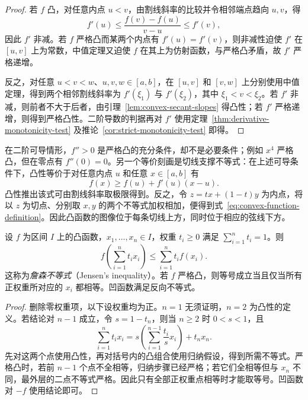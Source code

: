 \documentclass[UTF8,12pt,a4paper,fontset=fandol]{ctexbook}
\begin{document}
\begin{proof}
若 $f$ 凸，对任意内点 $u<v$，由割线斜率的比较并令相邻端点趋向 $u,v$，得
\begin{equation}
    f'(u)\leq\frac{f(v)-f(u)}{v-u}\leq f'(v),
    \label{eq:convex-derivative-secant-bounds}
\end{equation}
因此 $f'$ 非减。若 $f$ 严格凸而某两个内点有 $f'(u)=f'(v)$，则非减性迫使 $f'$ 在 $[u,v]$ 上为常数，中值定理又迫使 $f$ 在其上为仿射函数，与严格凸矛盾，故 $f'$ 严格递增。

反之，对任意 $u<v<w$、$u,v,w\in[a,b]$，在 $[u,v]$ 和 $[v,w]$ 上分别使用中值定理，得到两个相邻割线斜率为 $f'(\xi_1)$ 与 $f'(\xi_2)$，其中 $\xi_1<v<\xi_2$。若 $f'$ 非减，则前者不大于后者，由引理~\ref{lem:convex-secant-slopes} 得凸性；若 $f'$ 严格递增，则得到严格凸性。二阶导数的判据再对 $f'$ 使用定理~\ref{thm:derivative-monotonicity-test} 及推论~\ref{cor:strict-monotonicity-test} 即得。
\end{proof}

在二阶可导情形，$f''>0$ 是严格凸的充分条件，却不是必要条件；例如 $x^4$ 严格凸，但在零点有 $f''(0)=0$。另一个等价刻画是切线支撑不等式：在上述可导条件下，凸性等价于对任意内点 $u$ 和任意 $x\in[a,b]$ 有
\begin{equation}
    f(x)\geq f(u)+f'(u)(x-u).
    \label{eq:convex-supporting-tangent}
\end{equation}
凸性推出该式可由割线斜率取极限得到。反之，令 $z=tx+(1-t)y$ 为内点，将以 $z$ 为切点、分别取 $x,y$ 的两个不等式加权相加，便得到式~\eqref{eq:convex-function-definition}。因此凸函数的图像位于每条切线上方，同时位于相应的弦线下方。

\begin{theorem}[詹森不等式]
\label{thm:jensen-finite-convex-combinations}
设 $f$ 为区间 $I$ 上的凸函数，$x_1,\ldots,x_n\in I$，权重 $t_i\geq0$ 满足 $\sum_{i=1}^n t_i=1$。则
\begin{equation}
    f\left(\sum_{i=1}^n t_ix_i\right)
    \leq\sum_{i=1}^n t_if(x_i).
    \label{eq:jensen-finite-convex-combinations}
\end{equation}
这称为\emph{詹森不等式}（Jensen's inequality）。若 $f$ 严格凸，则等号成立当且仅当所有正权重所对应的 $x_i$ 都相等。凹函数满足反向不等式。
\end{theorem}

\begin{proof}
删除零权重项，以下设权重均为正。$n=1$ 无须证明，$n=2$ 为凸性的定义。若结论对 $n-1$ 成立，令 $s=1-t_n$，则当 $n\geq2$ 时 $0<s<1$，且
\[
    \sum_{i=1}^nt_ix_i
    =s\left(\sum_{i=1}^{n-1}\frac{t_i}s x_i\right)+t_nx_n.
\]
先对这两个点使用凸性，再对括号内的凸组合使用归纳假设，得到所需不等式。严格凸时，若前 $n-1$ 个点不全相等，归纳步骤已经严格；若它们全相等但与 $x_n$ 不同，最外层的二点不等式严格。因此只有全部正权重点相等时才能取等号。凹函数对 $-f$ 使用结论即可。
\end{proof}
\end{document}
